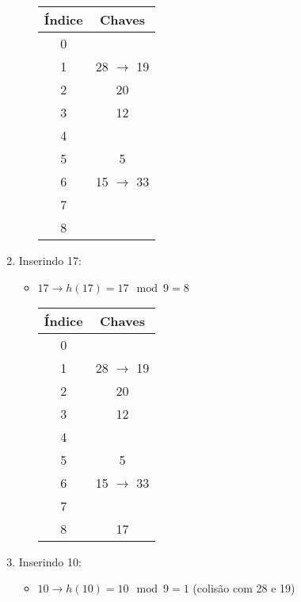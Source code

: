 \documentclass{article}
\begin{document}
\begin{enumerate}
\begin{itemize}
      \begin{center}
        \begin{tabular}{|c|c|}
        \hline
        \textbf{Índice} & \textbf{Chaves} \\
        \hline
        0 &  \\
        1 & 28 $\rightarrow$ 19\\
        2 & 20\\
        3 & 12\\
        4 &  \\
        5 & 5 \\
        6 & 15 $\rightarrow$ 33\\
        7 &  \\
        8 & \\
        \hline
        \end{tabular}
      \end{center}
    \end{itemize}
  \item Inserindo 17:
    \begin{itemize}
      \item \(17 \rightarrow h(17) = 17 \mod 9 = 8\)
          
      \begin{center}
        \begin{tabular}{|c|c|}
        \hline
        \textbf{Índice} & \textbf{Chaves} \\
        \hline
        0 &  \\
        1 & 28 $\rightarrow$ 19\\
        2 & 20\\
        3 & 12\\
        4 &  \\
        5 & 5 \\
        6 & 15 $\rightarrow$ 33\\
        7 &  \\
        8 & 17\\
        \hline
        \end{tabular}
      \end{center}
    \end{itemize}
  \item Inserindo 10:
    \begin{itemize}
      \item \(10 \rightarrow h(10) = 10 \mod 9 = 1\) (colisão com 28 e 19)
          

\end{itemize}
\end{enumerate}
\end{document}
